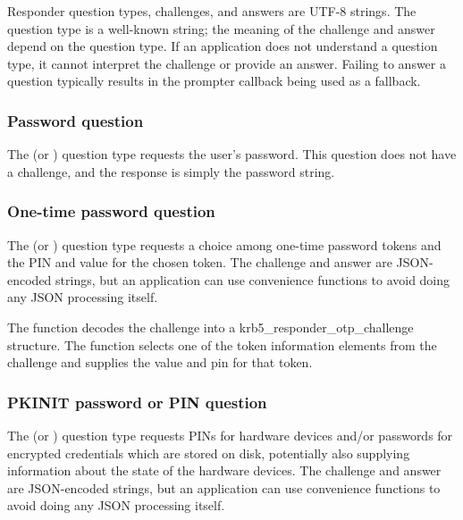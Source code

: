 \documentclass[letterpaper,10pt,english]{sphinxmanual}
\begin{document}
Responder question types, challenges, and answers are UTF-8 strings.
The question type is a well-known string; the meaning of the challenge
and answer depend on the question type.  If an application does not
understand a question type, it cannot interpret the challenge or
provide an answer.  Failing to answer a question typically results in
the prompter callback being used as a fallback.


\subsubsection{Password question}
\label{appdev/init_creds:password-question}
The  (or )
question type requests the user's password.  This question does not
have a challenge, and the response is simply the password string.


\subsubsection{One-time password question}
\label{appdev/init_creds:one-time-password-question}
The  (or ) question
type requests a choice among one-time password tokens and the PIN and
value for the chosen token.  The challenge and answer are JSON-encoded
strings, but an application can use convenience functions to avoid
doing any JSON processing itself.

The {\hyperref[appdev/refs/api/krb5_responder_otp_get_challenge:c.krb5_responder_otp_get_challenge]{}} function decodes the
challenge into a krb5\_responder\_otp\_challenge structure.  The
{\hyperref[appdev/refs/api/krb5_responder_otp_set_answer:c.krb5_responder_otp_set_answer]{}} function selects one of the
token information elements from the challenge and supplies the value
and pin for that token.


\subsubsection{PKINIT password or PIN question}
\label{appdev/init_creds:pkinit-password-or-pin-question}
The  (or ) question
type requests PINs for hardware devices and/or passwords for encrypted
credentials which are stored on disk, potentially also supplying
information about the state of the hardware devices.  The challenge and
answer are JSON-encoded strings, but an application can use convenience
functions to avoid doing any JSON processing itself.
\end{document}
